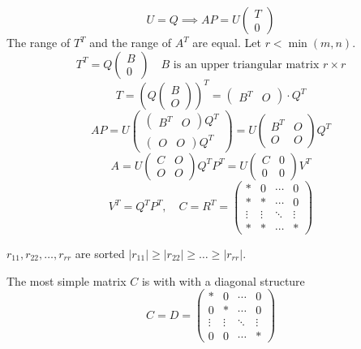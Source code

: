 \documentclass[a4paper, 12pt]{article}
\begin{document}
$$ U = Q \implies AP = U \begin{pmatrix} T \\ 0 \end{pmatrix} $$
The range of $T^T$ and the range of $A^T$ are equal. \newline
Let \( r < \min(m, n) \).
\[ T^T = Q \begin{pmatrix} B \\ 0 \end{pmatrix} \quad B \text{ is an upper triangular matrix } r \times r \]
\[ T = \left(Q\begin{pmatrix} B \\ O \end{pmatrix}\right)^T = \begin{pmatrix} B^T & O \end{pmatrix} \cdot Q^T \]
\[ A P = U \begin{pmatrix} \begin{pmatrix} B^T & O \end{pmatrix} Q^T \\ \begin{pmatrix} O & O \end{pmatrix} Q^T \end{pmatrix} = U \begin{pmatrix} B^T & O \\ O & O \end{pmatrix} Q^T \]
\[ A = U \begin{pmatrix} C & O \\ O & O \end{pmatrix} Q^T P^T = U \begin{pmatrix} C & 0 \\ 0 & 0 \end{pmatrix}V^T \]
\[ V^T = Q^T P^T, \quad C = R^T = \begin{pmatrix}
\ast & 0 & \cdots & 0 \\
\ast & \ast & \cdots & 0 \\
\vdots & \vdots & \ddots & \vdots \\
\ast & \ast & \cdots & \ast 
\end{pmatrix}
\]

$r_{11}, r_{22}, \ldots, r_{rr}$ are sorted $|r_{11}| \geq |r_{22}| \geq \ldots \geq |r_{rr}|$.

The most simple matrix $C$ is with with a diagonal structure
\[
C = D = \begin{pmatrix}
    \ast & 0 & \cdots & 0 \\
    0 & \ast & \cdots & 0 \\
    \vdots & \vdots & \ddots & \vdots \\
    0 & 0 & \cdots & \ast 
    \end{pmatrix}
\]
\end{document}
